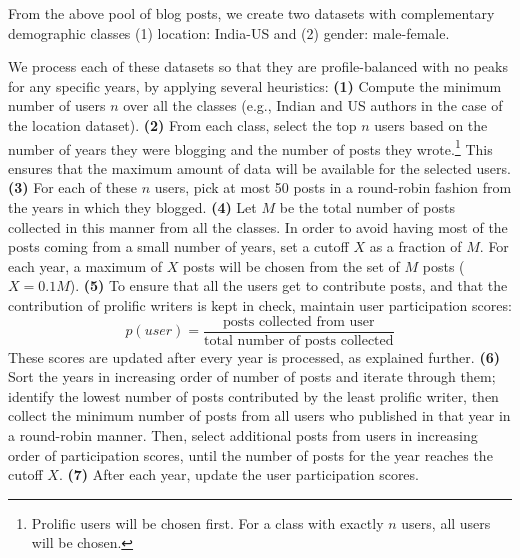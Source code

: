 \documentclass[11pt,letterpaper]{article}
\newcommand*\textfrac[2]{
  \frac{\text{#1}}{\text{#2}}
}
\begin{document}
From the above pool of blog posts, we create two datasets with complementary demographic classes (1) location: India-US and (2) gender: male-female. %

We process each of these datasets so that they are profile-balanced with no peaks for any specific years, by applying several heuristics:
\textbf{(1)} Compute the minimum number of users $n$ over all the classes (e.g., Indian and US authors in the case of the location dataset). \textbf{(2)} From each class, select the top $n$ users based on the number of years they were blogging and the number of posts they wrote.\footnote{Prolific users will be chosen first. For a class with exactly $n$ users, all users will be chosen.} This ensures that the maximum amount of data will be available for the selected users. \textbf{(3)} For each of these $n$ users, pick at most 50 posts in a round-robin fashion from the years in which they blogged. \textbf{(4)} Let $M$ be the total number of posts collected in this manner from all the classes. In order to avoid having most of the posts coming from a small number of years, set a cutoff $X$ as a fraction of $M$. For each year, a maximum of $X$ posts will be chosen from the set of $M$ posts ($X = 0.1M$). \textbf{(5)} To ensure that all the users get to contribute posts, and that the contribution of prolific writers is kept in check, maintain user participation scores: 
\vskip -0.3in
    \begin{equation}
    p(user) = \textfrac{posts collected from user}{total number of posts collected}
    \end{equation}
\vskip -0.1in
\noindent These scores are updated after every year is processed, as explained further. %
    \textbf{(6)} Sort the years in increasing order of number of posts and iterate through them; identify the lowest number of posts contributed by the least prolific writer, then collect the minimum number of posts from all users who published in that year in a round-robin manner. Then, select additional posts from users in increasing order of participation scores, until the number of posts for the year reaches the cutoff $X$. \textbf{(7)} After each year, update the user participation scores.
\end{document}
